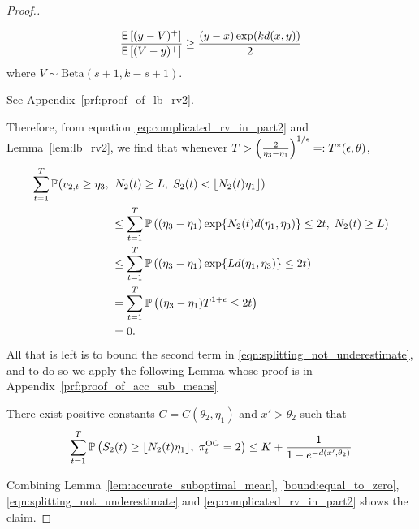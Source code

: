 \begin{proof}[Proof.]
\begin{lemma}
		\begin{equation*}
		\frac{\mathsf{E} \left[ (y-V)^+  \right]}{  \mathsf{E} \left[ (V - y)^+  \right] } \ge \frac{(y-x) \exp(k d(x,y))}{2}
		\end{equation*}
		where $V \sim \text{Beta}(s+1,k-s+1)$.
	\end{lemma}
	\begin{myproof}[Proof.]
		See Appendix~\ref{prf:proof_of_lb_rv2}.
	\end{myproof}
	Therefore, from equation \eqref{eq:complicated_rv_in_part2} and Lemma~\ref{lem:lb_rv2}, we find that whenever $T > \left(\frac{2}{\eta_3-\eta_1}\right)^{1/\epsilon} =: T^*(\epsilon, \theta)$,
	\begin{align}
	\sum_{t=1}^T \mathbb{P}(v_{2,t} \ge \eta_3 ,\; & \; N_2(t) \ge L,\; S_2(t) < \lfloor N_2(t) \eta_1\rfloor) \nonumber \\
	& \le  \sum_{t=1}^T\mathbb{P} \left(   (\eta_3-\eta_1) \exp\{N_2(t) d(\eta_1,\eta_3) \} \le 2t,\; N_2(t) \ge L \right) \nonumber \\
	& \le  \sum_{t=1}^T\mathbb{P} \left(   (\eta_3-\eta_1) \exp\{L d(\eta_1,\eta_3) \} \le 2t \right) \nonumber \\
	& =   \sum_{t=1}^T\mathbb{P} \left(   (\eta_3-\eta_1) T^{1+\epsilon} \le 2t \right) \nonumber \\
	& = 0. \label{bound:equal_to_zero}
	\end{align}
	All that is left is to bound the second term in \eqref{eqn:splitting_not_underestimate}, and to do so we apply the following Lemma whose proof is in Appendix~\ref{prf:proof_of_acc_sub_means}
	\begin{lemma} \label{lem:accurate_suboptimal_mean}
		There exist positive constants $C = C(\theta_2,\eta_1)$ and $x' > \theta_2$ such that
		\begin{equation*}
		\sum_{t=1}^T \mathbb{P} \left( S_2(t) \ge \lfloor N_2(t) \eta_1\rfloor, \; \pi^{\rm OG}_t = 2 \right) \le  K + \frac{1}{1 - e^{-d(x',\theta_2)}} 
		\end{equation*}
	\end{lemma}
	Combining Lemma~\ref{lem:accurate_suboptimal_mean}, \eqref{bound:equal_to_zero}, \eqref{eqn:splitting_not_underestimate} and \eqref{eq:complicated_rv_in_part2} shows the claim.
\end{proof}

